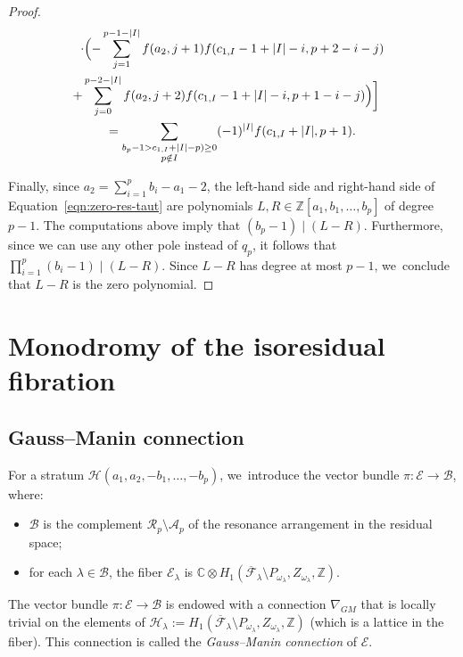 \documentclass[11pt]{article}
\newcommand\ZZ{{\mathbb Z}}
\newcommand\calH{{\mathcal H}}
\theoremstyle{definition}
\begin{document}
\begin{proof}
\begin{minipage}{\textwidth}
\begin{multline*}
\cdot\Bigl(-\sum_{j=1}^{p-1-|I|}f(a_2,j+1)f(c_{1,I}-1+|I|-i,p+2-i-j)\\
\shoveright{+\sum_{j=0}^{p-2-|I|}f(a_2,j+2)f(c_{1,I}-1+|I|-i,p+1-i-j)\Bigr)\biggr]}\\
=\sum_{\substack{b_p-1>c_{1,I}+|I|-p)\geq 0\\ p\notin I}}(-1)^{|I|}f(c_{1,I}+|I|,p+1).
\end{multline*}
\end{minipage}
\par\smallskip\noindent
Finally, since $a_2=\sum_{i=1}^p b_i -a_1-2$, the left-hand side and right-hand side of Equation~\eqref{eqn:zero-res-taut} are polynomials $L,R\in \mathbb{Z}[a_1,b_1,\ldots,b_p]$ of degree $p-1$. The computations above imply that $(b_p-1) \mid (L-R)$. Furthermore, since we can use any other pole instead of $q_p$, it follows that $\prod_{i=1}^p(b_i-1)\mid (L-R)$. Since $L-R$ has degree at most $p-1$, we~conclude that $L-R$ is the zero polynomial.
\end{proof}

\section{Monodromy of the isoresidual fibration}\label{sec:GaussManin}

\subsection{Gauss--Manin connection}

For a stratum $\mathcal{H}(a_{1},a_{2},-b_{1},\dots,-b_{p})$, we~introduce the vector bundle $\pi\colon\mathcal{E} \to \mathcal{B}$, where:
\begin{itemize}
\item $\mathcal{B}$ is the complement $\mathcal{R}_{p} \setminus \mathcal{A}_{p}$ of the resonance arrangement in the residual space;
\item for each $\lambda \in \mathcal{B}$, the fiber $\mathcal{E}_{\lambda}$ is $\mathbb{C} \otimes H_{1}(\overline{\mathcal{F}}_{\lambda} \setminus P_{\omega_{\lambda}}, Z_{\omega_{\lambda}},\ZZ)$.
\end{itemize}
The vector bundle $\pi\colon\mathcal{E} \to \mathcal{B}$ is endowed with a connection $\nabla_{GM}$ that is locally trivial on the elements of $\calH_{\lambda}:= H_{1}(\overline{\mathcal{F}}_{\lambda} \setminus P_{\omega_{\lambda}}, Z_{\omega_{\lambda}},\ZZ)$ (which is a lattice in the fiber). This connection is called the \textit{Gauss--Manin connection} of $\mathcal{E} $.
\end{document}
